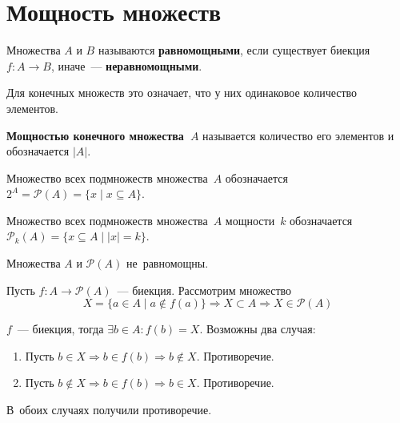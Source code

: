 \section{Мощность множеств}
Множества $A$ и $B$ называются \textbf{равномощными}, если существует биекция~$f \colon A \to B$, иначе~--- \textbf{неравномощными}.

Для конечных множеств это означает, что у них одинаковое количество элементов.

 \textbf{Мощностью конечного множества~$A$} называется количество его элементов и обозначается $|A|$.

Множество всех подмножеств множества~$A$ обозначается $2^A = \mathcal P(A) = \{ x \mid x \subseteq A \}$.

Множество всех подмножеств множества~$A$ мощности~$k$ обозначается $\mathcal P_k(A) = \{ x \subseteq A \mid |x| = k \}$.

\begin{theorem}[Кантора]
Множества $A$ и $\mathcal P(A)$ не~равномощны.
\end{theorem}
\begin{proofcontra}
Пусть $f \colon A \to \mathcal P(A)$~--- биекция. Рассмотрим множество
\begin{equation*}
X = \{ a \in A \mid a \notin f(a) \} \Rightarrow X \subset A \Rightarrow X \in \mathcal P(A)
\end{equation*}

$f$~--- биекция, тогда $\exists b \in A \colon f(b) = X$.
Возможны два случая:
\begin{enumerate}
	\item Пусть $b \in X \Rightarrow b \in f(b) \Rightarrow b \notin X$.
	Противоречие.
	\item Пусть $b \notin X \Rightarrow b \in f(b) \Rightarrow b \in X$.
	Противоречие.
\end{enumerate}

В~обоих случаях получили противоречие.
\end{proofcontra}

